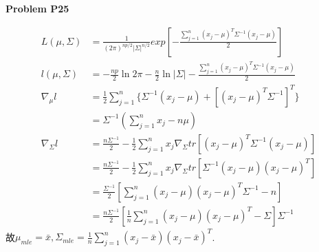 \documentclass[UTF8,12pt]{article}
\newenvironment{problem}[2][Problem]
{ \begin{mdframed}[backgroundcolor=gray!20] \textbf{#1 #2}}
	{  \end{mdframed}}
\newenvironment{answer}
{}
{}
\newenvironment{eq}
{
	\begin{equation}
		\begin{aligned}\nonumber
}
{
		\end{aligned}
	\end{equation}
}
\begin{document}
\begin{problem}{P25}
\end{problem}
\begin{answer}
	\begin{eq}
		L(\mu,\Sigma) &=
		\frac{1}{(2\pi)^{np/2}|\Sigma|^{n/2}}exp[-\frac{\sum_{j=1}^{n} 
		(x_j-\mu)^T \Sigma^{-1} (x_j-\mu)}{2}]\\
		l(\mu,\Sigma)&=-\frac{np}{2}\ln{2\pi} - \frac{n}{2}\ln{|\Sigma|}
		-\frac{\sum_{j=1}^{n} (x_j-\mu)^T \Sigma^{-1} (x_j-\mu)}{2}\\
		\nabla_\mu l &= \frac{1}{2} \sum_{j=1}^n \{\Sigma^{-1}(x_j-\mu)+
		[(x_j-\mu)^T \Sigma^{-1}]^T\}\\
		&= \Sigma^{-1} (\sum_{j=1}^n x_j - n\mu)\\
		\nabla_\Sigma l&= \frac{n\Sigma^{-1}}{2} - 
		\frac{1}{2}\sum_{j=1}^n x_j \nabla_\Sigma tr[(x_j-\mu)^T \Sigma^{-1} (x_j-\mu)]\\
		&= \frac{n\Sigma^{-1}}{2}- 
		\frac{1}{2}\sum_{j=1}^n x_j \nabla_\Sigma tr[ \Sigma^{-1} (x_j-\mu) (x_j-\mu)^T]\\
		&= \frac{\Sigma^{-1}}{2}[\sum_{j=1}^n (x_j-\mu)(x_j-\mu)^T\Sigma^{-1} - n]\\
		&= \frac{n\Sigma^{-1}}{2}[\frac{1}{n}\sum_{j=1}^n (x_j-\mu)(x_j-\mu)^T -\Sigma]\Sigma^{-1}
	\end{eq}
	故$\mu_{mle}=\bar{x},\Sigma_{mle}= \frac{1}{n}\sum_{j=1}^n (x_j-\bar{x})(x_j-\bar{x})^T$.
\end{answer}
\end{document}
